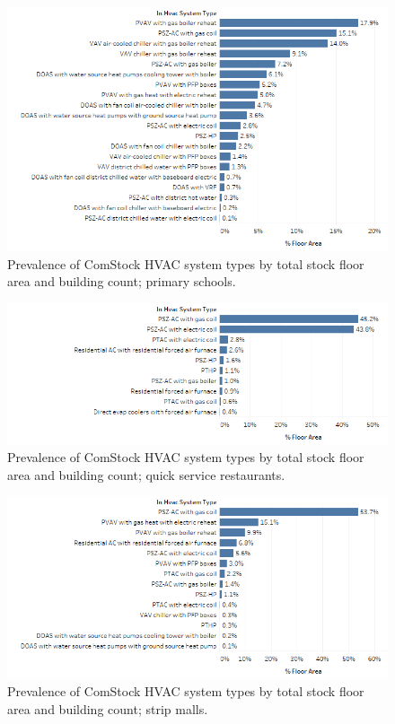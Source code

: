 \begin{figure}
    \centering \includegraphics[width=1.0\textwidth]{figures/HVAC_SYS_Type_PREV_Primary_School.png}
    \caption[HVAC system type prevalence in primary schools]{Prevalence of ComStock HVAC system types by total stock floor area and building count; primary schools.}
    \label{fig:hvac_sys_type_prevalence_primary_school}
\end{figure}

\begin{figure}
    \centering \includegraphics[width=1.0\textwidth]{figures/HVAC_SYS_Type_PREV_QSR.png}
    \caption[HVAC system type prevalence in quick service restaurants]{Prevalence of ComStock HVAC system types by total stock floor area and building count; quick service restaurants.}
    \label{fig:hvac_sys_type_prevalence_qsr}
\end{figure}

\begin{figure}
    \centering \includegraphics[width=1.0\textwidth]{figures/HVAC_SYS_Type_PREV_Retail_Stripmall.png}
    \caption[HVAC system type prevalence in strip malls]{Prevalence of ComStock HVAC system types by total stock floor area and building count; strip malls.}
    \label{fig:hvac_sys_type_prevalence_retail_strip_mall}
\end{figure}

